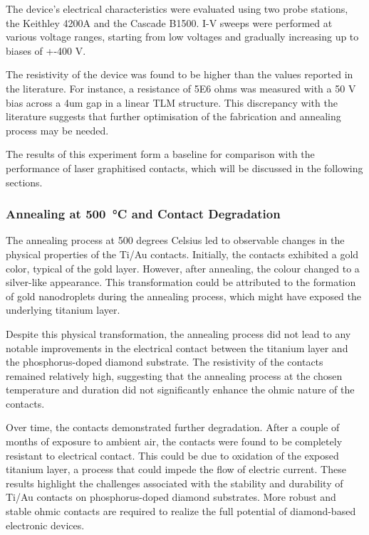 The device's electrical characteristics were evaluated using two probe stations, the Keithley 4200A and the Cascade B1500. I-V sweeps were performed at various voltage ranges, starting from low voltages and gradually increasing up to biases of +-400 V.

The resistivity of the device was found to be higher than the values reported in the literature. For instance, a resistance of 5E6 ohms was measured with a 50 V bias across a 4um gap in a linear TLM structure. This discrepancy with the literature suggests that further optimisation of the fabrication and annealing process may be needed.

The results of this experiment form a baseline for comparison with the performance of laser graphitised contacts, which will be discussed in the following sections.

\subsubsection{Annealing at \SI{500}{\celsius} and Contact Degradation}
\label{subsubsec:annealing}
The annealing process at 500 degrees Celsius led to observable changes in the physical properties of the Ti/Au contacts. Initially, the contacts exhibited a gold color, typical of the gold layer. However, after annealing, the colour changed to a silver-like appearance. This transformation could be attributed to the formation of gold nanodroplets during the annealing process, which might have exposed the underlying titanium layer.

Despite this physical transformation, the annealing process did not lead to any notable improvements in the electrical contact between the titanium layer and the phosphorus-doped diamond substrate. The resistivity of the contacts remained relatively high, suggesting that the annealing process at the chosen temperature and duration did not significantly enhance the ohmic nature of the contacts.

Over time, the contacts demonstrated further degradation. After a couple of months of exposure to ambient air, the contacts were found to be completely resistant to electrical contact. This could be due to oxidation of the exposed titanium layer, a process that could impede the flow of electric current. These results highlight the challenges associated with the stability and durability of Ti/Au contacts on phosphorus-doped diamond substrates. More robust and stable ohmic contacts are required to realize the full potential of diamond-based electronic devices.

